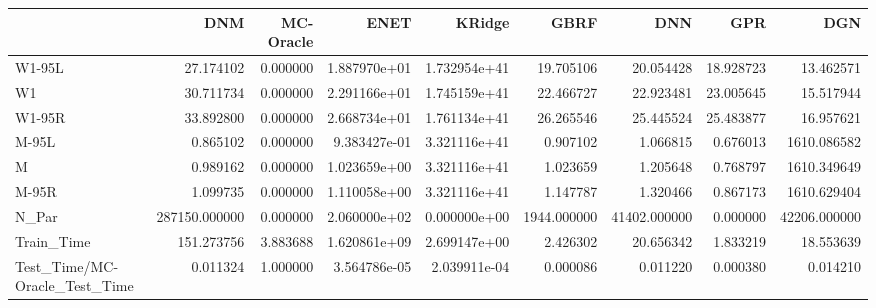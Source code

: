 \begin{tabular}{lrrrrrrrr}
\toprule
{} &            DNM &  MC-Oracle &          ENET &        KRidge &         GBRF &           DNN &        GPR &           DGN \\
\midrule
W1-95L                        &      27.174102 &   0.000000 &  1.887970e+01 &  1.732954e+41 &    19.705106 &     20.054428 &  18.928723 &     13.462571 \\
W1                            &      30.711734 &   0.000000 &  2.291166e+01 &  1.745159e+41 &    22.466727 &     22.923481 &  23.005645 &     15.517944 \\
W1-95R                        &      33.892800 &   0.000000 &  2.668734e+01 &  1.761134e+41 &    26.265546 &     25.445524 &  25.483877 &     16.957621 \\
M-95L                         &       0.865102 &   0.000000 &  9.383427e-01 &  3.321116e+41 &     0.907102 &      1.066815 &   0.676013 &   1610.086582 \\
M                             &       0.989162 &   0.000000 &  1.023659e+00 &  3.321116e+41 &     1.023659 &      1.205648 &   0.768797 &   1610.349649 \\
M-95R                         &       1.099735 &   0.000000 &  1.110058e+00 &  3.321116e+41 &     1.147787 &      1.320466 &   0.867173 &   1610.629404 \\
N\_Par                         &  287150.000000 &   0.000000 &  2.060000e+02 &  0.000000e+00 &  1944.000000 &  41402.000000 &   0.000000 &  42206.000000 \\
Train\_Time                    &     151.273756 &   3.883688 &  1.620861e+09 &  2.699147e+00 &     2.426302 &     20.656342 &   1.833219 &     18.553639 \\
Test\_Time/MC-Oracle\_Test\_Time &       0.011324 &   1.000000 &  3.564786e-05 &  2.039911e-04 &     0.000086 &      0.011220 &   0.000380 &      0.014210 \\
\bottomrule
\end{tabular}
